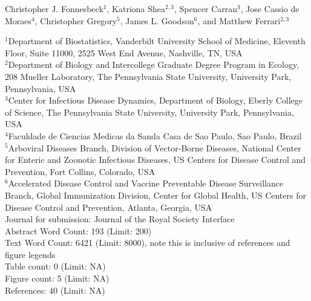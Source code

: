 Christopher J. Fonnesbeck$^{1}$, Katriona Shea$^{2,3}$, Spencer Carran$^{3}$, Jose Cassio de Moraes$^{4}$, Christopher Gregory$^{5}$, James L. Goodson$^{6}$, and Matthew Ferrari$^{2,3}$

$^{1}$Department of Biostatistics, Vanderbilt University School of Medicine, Eleventh Floor, Suite 11000, 2525 West End Avenue, Nashville, TN, USA \\
$^{2}$Department of Biology and Intercollege Graduate Degree Program in Ecology, 208 Mueller Laboratory, The Pennsylvania State University, University Park, Pennsylvania, USA \\
$^{3}$Center for Infectious Disease Dynamics, Department of Biology, Eberly College of Science, The Pennsylvania State University, University Park, Pennsylvania, USA \\
$^{4}$Faculdade de Ciencias Medicas da Sanda Casa de Sao Paulo, Sao Paulo, Brazil \\
$^{5}$Arboviral Diseases Branch, Division of Vector-Borne Diseases, National Center for Enteric and Zoonotic Infectious Diseases, US Centers for Disease Control and Prevention, Fort Collins, Colorado, USA \\
$^{6}$Accelerated Disease Control and Vaccine Preventable Disease Surveillance Branch, Global Immunization Division, Center for Global Health, US Centers for Disease Control and Prevention, Atlanta, Georgia, USA \\

Journal for submission: Journal of the Royal Society Interface\\
Abstract Word Count: 193 (Limit: 200)\\
Text Word Count: 6421 (Limit: 8000), note this is inclusive of references and figure legends\\
Table count: 0 (Limit: NA)\\
Figure count: 5 (Limit: NA)\\
References: 40 (Limit: NA)
